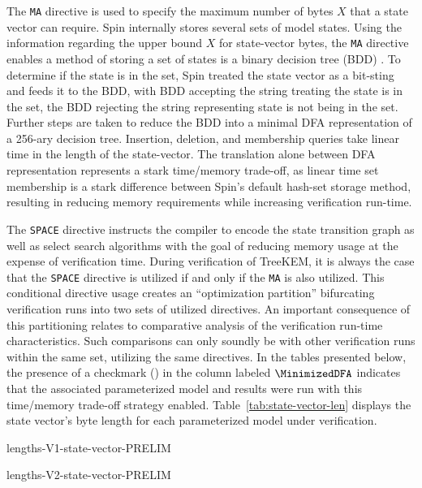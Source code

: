 The \texttt{MA} directive is used to specify the maximum number of bytes \(X\) that a state vector can require.
Spin internally stores several sets of model states.
Using the information regarding the upper bound \(X\) for state-vector bytes, the \texttt{MA} directive enables a method of storing a set of states is a binary decision tree (BDD) \autocite{holzmann1999minimized}.
To determine if the state is in the set, Spin treated the state vector as a bit-sting and feeds it to the BDD, with BDD accepting the string treating the state is in the set, the BDD rejecting the string representing state is not being in the set.
Further steps are taken to reduce the BDD into a minimal DFA representation of a 256-ary decision tree.
Insertion, deletion, and membership queries take linear time in the length of the state-vector.
The translation alone between DFA representation represents a stark time/memory trade-off, as linear time set membership is a stark difference between Spin's default hash-set storage method, resulting in reducing memory requirements while increasing verification run-time.

The \texttt{SPACE} directive instructs the compiler to encode the state transition graph as well as select search algorithms with the goal of reducing memory usage at the expense of verification time.
During verification of TreeKEM, it is always the case that the \texttt{SPACE} directive is utilized if and only if the \texttt{MA} is also utilized.
This conditional directive usage creates an ``optimization partition'' bifurcating verification runs into two sets of utilized directives.
An important consequence of this partitioning relates to comparative analysis of the verification run-time characteristics.
Such comparisons can only soundly be with other verification runs within the same set, utilizing the same directives.
In the tables presented below, the presence of a checkmark (\cmark) in the column labeled $\MinimizedDFA$ indicates that the associated parameterized model and results were run with this time/memory trade-off strategy enabled.
Table\ \ref{tab:state-vector-len} displays the state vector's byte length for each \CGKAmod{\VersionOne}{}{} parameterized model under verification.

\begin{table}[ht!]
\caption[State vector byte length for each model]{%
\label{tab:state-vector-len}%
State vector byte length for each model parameterization of \CGKAmod{\VersionOne}{}{} and \CGKAmod{\VersionTwo}{}{}.
}%
\hfill
\begin{minipage}{0.45\textwidth}
  \centering
  {lengths-V1-state-vector-PRELIM}
\end{minipage}
\begin{minipage}{0.45\textwidth}
  \centering
  {lengths-V2-state-vector-PRELIM}
\end{minipage}
\hfill
\end{table}

